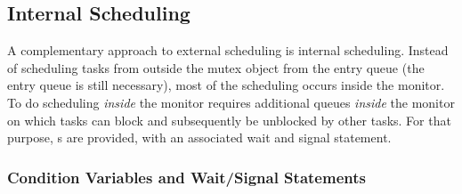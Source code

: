 \documentclass[openright,twoside]{report}
\begin{document}
\subsection{Internal Scheduling}
\label{s:InternalScheduling}

A complementary approach to external scheduling is internal scheduling.
Instead of scheduling tasks from outside the mutex object from the entry queue (the entry queue is still necessary), most of the scheduling occurs inside the monitor.
To do scheduling \emph{inside} the monitor requires additional queues \emph{inside} the monitor on which tasks can block and subsequently be unblocked by other tasks.
For that purpose, s are provided, with an associated wait and signal statement.


\subsubsection{Condition Variables and Wait/Signal Statements}
\label{s:CondVarWaitSignal}
\end{document}
